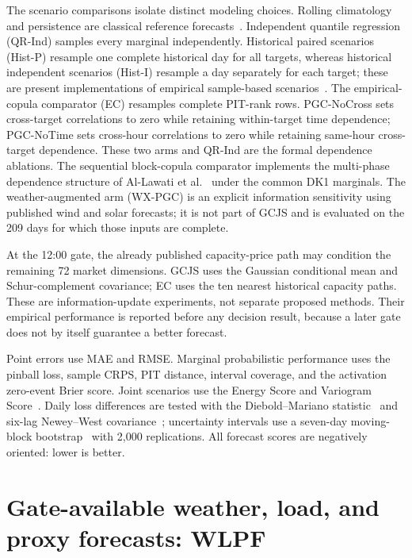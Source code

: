 \documentclass[11pt,a4paper]{article}
\begin{document}
The scenario comparisons isolate distinct modeling choices.  Rolling
climatology and persistence are classical reference forecasts~\cite{murphy1992}.
Independent
quantile regression (QR-Ind) samples every marginal independently.  Historical
paired scenarios (Hist-P) resample one complete historical day for all
targets, whereas historical independent scenarios (Hist-I) resample a day
separately for each target; these are present implementations of empirical
sample-based scenarios~\cite{shapiro2014}.  The empirical-copula comparator (EC) resamples
complete PIT-rank rows.  PGC-NoCross sets cross-target correlations to zero
while retaining within-target time dependence; PGC-NoTime sets cross-hour
correlations to zero while retaining same-hour cross-target dependence.  These
two arms and QR-Ind are the formal dependence ablations.  The sequential
block-copula comparator implements the multi-phase dependence structure of
Al-Lawati et al.~\cite{allawati2021} under the common DK1 marginals.  The
weather-augmented arm (WX-PGC) is an explicit information sensitivity using
published wind and solar forecasts; it is not part of GCJS and is evaluated
on the 209 days for which those inputs are complete.

At the 12:00 gate, the already published capacity-price path may condition the
remaining 72 market dimensions.  GCJS uses the Gaussian conditional mean and
Schur-complement covariance; EC uses the ten nearest historical capacity
paths.  These are information-update experiments, not separate proposed
methods.  Their empirical performance is reported before any decision result,
because a later gate does not by itself guarantee a better forecast.

Point errors use MAE and RMSE.  Marginal probabilistic performance uses the
pinball loss, sample CRPS, PIT distance, interval coverage, and the activation
zero-event Brier score.  Joint scenarios use the Energy Score and Variogram
Score~\cite{gneitingraftery2007}.  Daily loss differences are tested with the
Diebold--Mariano statistic~\cite{dieboldmariano1995} and six-lag
Newey--West covariance~\cite{neweywest1987}; uncertainty intervals use a
seven-day moving-block bootstrap~\cite{kunsch1989} with 2,000 replications.
All forecast scores are negatively oriented: lower is better.

\section{Gate-available weather, load, and proxy forecasts: WLPF}
\label{sec:wlpf}
\end{document}
